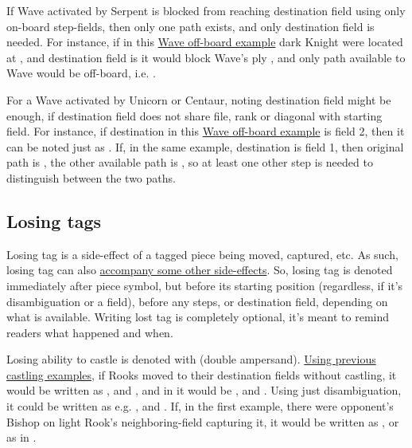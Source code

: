 If Wave activated by Serpent is blocked from reaching destination field using only on-board
step-fields, then only one path exists, and only destination field is needed. For instance,
if in this
\hyperref[fig:scn_tr_44_wave_out_of_board]{Wave off-board example} dark Knight were located at
, and destination field is  it would block Wave's ply
, and only path available to Wave would be off-board,
i.e. .

For a Wave activated by Unicorn or Centaur, noting destination field might be enough, if
destination field does not share file, rank or diagonal with starting field. For instance, if
destination in this \hyperref[fig:scn_mv_034_wave_off_board]{Wave off-board example} is field 2,
then it can be noted just as . If, in the same example,
destination is field 1, then original path is ,
the other available path is , so at least one
other step is needed to distinguish between the two paths.

\subsection*{Losing tags}
\label{sec:Appendix/Notation/Losing tags}

Losing tag is a side-effect of a tagged piece being moved, captured, etc. As such,
losing tag can also
\hyperref[tbl:Appendix/Summary/Accompanying-losing-tags]{accompany some other side-effects}.
So, losing tag is denoted immediately after piece symbol, but before its starting
position (regardless, if it's disambiguation or a field), before any steps, or
destination field, depending on what is available. Writing lost tag is completely
optional, it's meant to remind readers what happened and when.

Losing ability to castle is denoted with \alg{\&\&} (double ampersand).
\hyperref[sec:Appendix/Notation/Castling]{Using previous castling examples}, if
Rooks moved to their destination fields without castling, it would be written as
, and , and in  it would be ,
and . Using just disambiguation, it could be written as e.g.
, and .\newline
\indent
If, in the first example, there were opponent's Bishop on light Rook's neighboring-field
capturing it, it would be written as , or as  in
.

